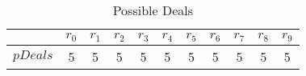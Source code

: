 \documentclass{article}
\begin{document}
\begin{table}[ht] 
\begin{tabular}{ | c || c | c | c | c | c | c | c | c | c | c  | } 
\hline$\;$   & $r_{0}$ & $r_{1}$ & $r_{2}$ & $r_{3}$ & $r_{4}$ & $r_{5}$ & $r_{6}$ & $r_{7}$ & $r_{8}$ & $r_{9}$ \\ 
\hline 
$pDeals$ & 5  & 5  & 5  & 5  & 5  & 5  & 5  & 5  & 5  & 5  \\ 
\hline 
\end{tabular}
\caption{Possible Deals}
\label{pDeals-0}
\end{table}






\end{document}
